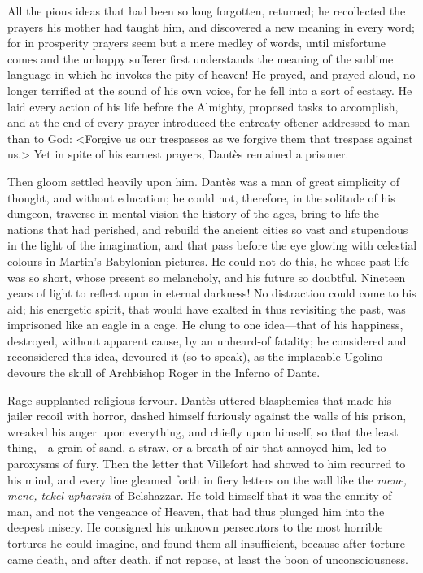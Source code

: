  All the pious ideas that had been so long forgotten, returned; he recollected the prayers his mother had taught him, and discovered a new meaning in every word; for in prosperity prayers seem but a mere medley of words, until misfortune comes and the unhappy sufferer first understands the meaning of the sublime language in which he invokes the pity of heaven! He prayed, and prayed aloud, no longer terrified at the sound of his own voice, for he fell into a sort of ecstasy. He laid every action of his life before the Almighty, proposed tasks to accomplish, and at the end of every prayer introduced the entreaty oftener addressed to man than to God: <Forgive us our trespasses as we forgive them that trespass against us.> Yet in spite of his earnest prayers, Dantès remained a prisoner. 

 Then gloom settled heavily upon him. Dantès was a man of great simplicity of thought, and without education; he could not, therefore, in the solitude of his dungeon, traverse in mental vision the history of the ages, bring to life the nations that had perished, and rebuild the ancient cities so vast and stupendous in the light of the imagination, and that pass before the eye glowing with celestial colours in Martin's Babylonian pictures. He could not do this, he whose past life was so short, whose present so melancholy, and his future so doubtful. Nineteen years of light to reflect upon in eternal darkness! No distraction could come to his aid; his energetic spirit, that would have exalted in thus revisiting the past, was imprisoned like an eagle in a cage. He clung to one idea—that of his happiness, destroyed, without apparent cause, by an unheard-of fatality; he considered and reconsidered this idea, devoured it (so to speak), as the implacable Ugolino devours the skull of Archbishop Roger in the Inferno of Dante. 

 Rage supplanted religious fervour. Dantès uttered blasphemies that made his jailer recoil with horror, dashed himself furiously against the walls of his prison, wreaked his anger upon everything, and chiefly upon himself, so that the least thing,—a grain of sand, a straw, or a breath of air that annoyed him, led to paroxysms of fury. Then the letter that Villefort had showed to him recurred to his mind, and every line gleamed forth in fiery letters on the wall like the \textit{mene, mene, tekel upharsin} of Belshazzar. He told himself that it was the enmity of man, and not the vengeance of Heaven, that had thus plunged him into the deepest misery. He consigned his unknown persecutors to the most horrible tortures he could imagine, and found them all insufficient, because after torture came death, and after death, if not repose, at least the boon of unconsciousness. 

